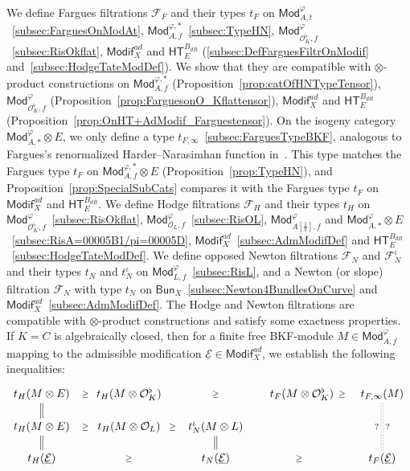 \documentclass[11pt]{article}
\theoremstyle{definition}
\numberwithin{equation}{section}
\numberwithin{figure}{section}
\numberwithin{table}{section}
\newcommand{\Mod}{\mathsf{Mod}}
\newcommand{\Modif}{\mathsf{Modif}}
\newcommand{\HT}{\mathsf{HT}}
\newcommand{\Bun}{\mathsf{Bun}}
\newcommand*{\dR}{dR}
\begin{document}
We define Fargues filtrations $\mathcal{F}_{F}$ and their types $t_{F}$ on $\Mod_{A,t}^{\varphi}$~\eqref{subsec:FarguesOnModAt}, $\Mod_{A,f}^{\varphi,\ast}$~\eqref{subsec:TypeHN}, $\Mod_{\mathcal{O}_{K}^{\flat},f}^{\varphi}$~\eqref{subsec:RisOkflat}, $\Modif_{X}^{ad}$ and $\HT_{E}^{B_{\dR}}$ (\ref{subsec:DefFarguesFiltrOnModif} and~\ref{subsec:HodgeTateModDef}). We show that they are compatible with $\otimes$-product constructions on $\Mod_{A,f}^{\varphi,\ast}$ (Proposition~\ref{prop:catOfHNTypeTensor}), $\Mod_{\mathcal{O}_{K}^{\flat},f}^{\varphi}$ (Proposition~\ref{prop:FarguesonO_Kflattensor}), $\Modif_{X}^{ad}$ and $\HT_{E}^{B_{\dR}}$ (Proposition~\ref{prop:OnHT+AdModif_Farguestensor}). On the isogeny category $\Mod_{A,\ast}^{\varphi}\otimes E$, we only define a type $t_{F,\infty}$~\eqref{subsec:FarguesTypeBKF}, analogous to Fargues's renormalized Harder--Narasimhan function in~\cite{Fa12}. This type matches the Fargues type $t_{F}$ on $\Mod_{A,f}^{\varphi,\ast}\otimes E$ (Proposition~\ref{prop:TypeHN}), and Proposition~\ref{prop:SpecialSubCats} compares it with the Fargues type $t_{F}$ on $\Modif_{X}^{ad}$ and $\HT_{E}^{B_{\dR}}$. We define Hodge filtrations $\mathcal{F}_{H}$ and their types $t_{H}$ on $\Mod_{\mathcal{O}_{K}^{\flat},f}^{\varphi}$~\eqref{subsec:RisOkflat}, $\Mod_{\mathcal{O}_{L},f}^{\varphi}$~\eqref{subsec:RisOL}, $\Mod_{A[\frac{1}{\pi}],f}^{\varphi}$ and $\Mod_{A,\ast}^{\varphi}\otimes E$~\eqref{subsec:RisA=00005B1/pi=00005D}, $\Modif_{X}^{ad}$~\eqref{subsec:AdmModifDef} and $\HT_{E}^{B_{\dR}}$~\eqref{subsec:HodgeTateModDef}. We define opposed Newton filtrations $\mathcal{F}_{N}$ and $\mathcal{F}_{N}^{\iota}$ and their types $t_{N}$ and $t_{N}^{\iota}$ on $\Mod_{L,f}^{\varphi}$~\eqref{subsec:RisL}, and a Newton (or slope) filtration $\mathcal{F}_{N}$ with type $t_{N}$ on $\Bun_{X}$~\eqref{subsec:Newton4BundlesOnCurve} and $\Modif_{X}^{ad}$~\eqref{subsec:AdmModifDef}. The Hodge and Newton filtrations are compatible with $\otimes$-product constructions and satisfy some exactness properties. If $K=C$ is algebraically closed, then for a finite free BKF-module $M\in\Mod_{A,f}^{\varphi}$ mapping to the admissible modification $\underline{\mathcal{E}}\in\Modif_{X}^{ad}$, we establish the following inequalities:
\[
\xymatrix@R=1pc@C=1.5pc{
t_{H}(M\otimes E)\ar@{}[r]|{\geq}\ar@{=}[d] & t_{H}(M\otimes\mathcal{O}_{K}^{\flat})\ar@{}[rr]|{\geq} & & t_{F}(M\otimes\mathcal{O}_{K}^{\flat})\ar@{}[r]|{\geq} & t_{F,\infty}(M)\ar@{:}[dd]_{?}^{?}\\
t_{H}(M\otimes E)\ar@{}[r]|{\geq}\ar@{=}[d] & t_{H}(M\otimes\mathcal{O}_{L})\ar@{}[r]|{\geq} & t_{N}^{\iota}(M\otimes L)\ar@{=}[d]\\
t_{H}(\underline{\mathcal{E}})\ar@{}[rr]|{\geq} & & t_{N}(\underline{\mathcal{E}})\ar@{}[rr]|{\geq} & & t_{F}(\underline{\mathcal{E}}) }
\]
\end{document}

